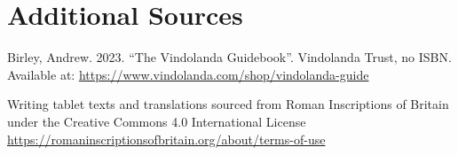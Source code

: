 \documentclass[sigconf]{acmart}
\begin{document}



\section*{Additional Sources}
Birley, Andrew. 2023. ``The Vindolanda Guidebook''. Vindolanda Trust, no ISBN. Available
at: \url{https://www.vindolanda.com/shop/vindolanda-guide}

Writing tablet texts and translations sourced from Roman Inscriptions of Britain
under the Creative Commons 4.0 International License
\url{https://romaninscriptionsofbritain.org/about/terms-of-use}

\appendix
\end{document}
